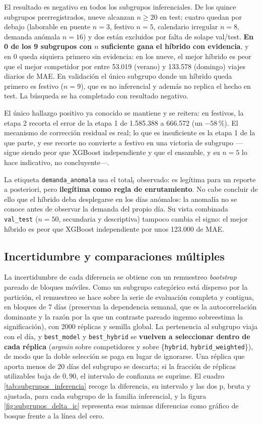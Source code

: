 El resultado es negativo en todos los subgrupos inferenciales. De los quince subgrupos prerregistrados, nueve alcanzan $n \geq
20$ en test; cuatro quedan por debajo (laborable en puente $n=3$, festivo $n=5$, calendario
irregular $n=8$, demanda anómala $n=16$) y dos están excluidos por falta de solape
val/test. \textbf{En 0 de los 9 subgrupos con $n$ suficiente gana el híbrido con
evidencia}, y en 0 queda siquiera primero sin evidencia: en los nueve, el mejor híbrido es
peor que el mejor competidor por entre 53.019 (verano) y 133.578 (domingo) viajes diarios
de MAE. En validación el único subgrupo donde un híbrido queda primero es festivo ($n=9$),
que es no inferencial y además no replica el hecho en test. La búsqueda se ha completado con
resultado negativo.

El único hallazgo positivo ya conocido se mantiene y se reitera: en festivos, la etapa 2
recorta el error de la etapa 1 de 1.585.388 a 666.572 (un $-58$\,\%). El mecanismo de
corrección residual es real; lo que es insuficiente es la etapa 1 de la que parte, y ese
recorte no convierte a festivo en una victoria de subgrupo —sigue siendo peor que
XGBoost independiente y que el ensamble, y su $n=5$ lo hace indicativo, no concluyente—.

La etiqueta \texttt{demanda\_anomala} usa el $\text{total}_t$ observado: es legítima para un
reporte a posteriori, pero \textbf{ilegítima como regla de enrutamiento}. No cabe concluir
de ello que el híbrido deba desplegarse en los días anómalos: la anomalía no se conoce
antes de observar la demanda del propio día. Su vista combinada \texttt{val\_test}
($n=50$, secundaria y descriptiva) tampoco cambia el signo: el mejor híbrido es peor que
XGBoost independiente por unos 123.000 de MAE.

\subsection{Incertidumbre y comparaciones múltiples}\label{sec:desglose_incertidumbre}

La incertidumbre de cada diferencia se obtiene con un remuestreo \emph{bootstrap} pareado de bloques
móviles. Como un subgrupo categórico está disperso por la partición, el remuestreo se hace
sobre la serie de evaluación completa y contigua, en bloques de 7 días (preservan la
dependencia semanal, que es la autocorrelación dominante y la razón por la que un contraste
pareado ingenuo sobreestima la significación), con 2000 réplicas y semilla global. La
pertenencia al subgrupo viaja con el día, y \texttt{best\_model} y \texttt{best\_hybrid} se
\textbf{vuelven a seleccionar dentro de cada réplica} (\emph{argmin} sobre competidores y
sobre \{\texttt{hybrid}, \texttt{hybrid\_weighted}\}), de modo que la doble selección se
paga en lugar de ignorarse. Una réplica que aporta menos de 20 días del subgrupo se
descarta; si la fracción de réplicas utilizables baja de $0{,}90$, el intervalo de
confianza se suprime. El cuadro \ref{tab:subgrupos_inferencia} recoge la diferencia, su
intervalo y las dos p, bruta y ajustada, para cada subgrupo de la familia inferencial, y
la figura \ref{fig:subgrupos_delta_ic} representa esas mismas diferencias como gráfico de
bosque frente a la línea del cero.

